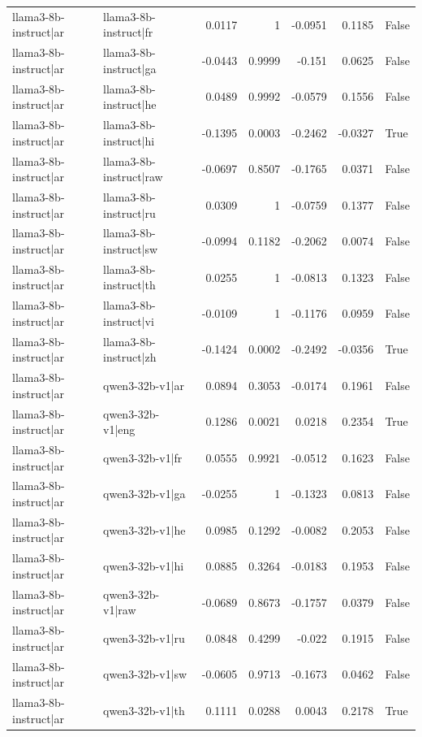 \begin{table}
\begin{tabular}{l l r r r r l}
llama3-8b-instruct|ar & llama3-8b-instruct|fr & 0.0117 & 1 & -0.0951 & 0.1185 & False \\
llama3-8b-instruct|ar & llama3-8b-instruct|ga & -0.0443 & 0.9999 & -0.151 & 0.0625 & False \\
llama3-8b-instruct|ar & llama3-8b-instruct|he & 0.0489 & 0.9992 & -0.0579 & 0.1556 & False \\
llama3-8b-instruct|ar & llama3-8b-instruct|hi & -0.1395 & 0.0003 & -0.2462 & -0.0327 & True \\
llama3-8b-instruct|ar & llama3-8b-instruct|raw & -0.0697 & 0.8507 & -0.1765 & 0.0371 & False \\
llama3-8b-instruct|ar & llama3-8b-instruct|ru & 0.0309 & 1 & -0.0759 & 0.1377 & False \\
llama3-8b-instruct|ar & llama3-8b-instruct|sw & -0.0994 & 0.1182 & -0.2062 & 0.0074 & False \\
llama3-8b-instruct|ar & llama3-8b-instruct|th & 0.0255 & 1 & -0.0813 & 0.1323 & False \\
llama3-8b-instruct|ar & llama3-8b-instruct|vi & -0.0109 & 1 & -0.1176 & 0.0959 & False \\
llama3-8b-instruct|ar & llama3-8b-instruct|zh & -0.1424 & 0.0002 & -0.2492 & -0.0356 & True \\
llama3-8b-instruct|ar & qwen3-32b-v1|ar & 0.0894 & 0.3053 & -0.0174 & 0.1961 & False \\
llama3-8b-instruct|ar & qwen3-32b-v1|eng & 0.1286 & 0.0021 & 0.0218 & 0.2354 & True \\
llama3-8b-instruct|ar & qwen3-32b-v1|fr & 0.0555 & 0.9921 & -0.0512 & 0.1623 & False \\
llama3-8b-instruct|ar & qwen3-32b-v1|ga & -0.0255 & 1 & -0.1323 & 0.0813 & False \\
llama3-8b-instruct|ar & qwen3-32b-v1|he & 0.0985 & 0.1292 & -0.0082 & 0.2053 & False \\
llama3-8b-instruct|ar & qwen3-32b-v1|hi & 0.0885 & 0.3264 & -0.0183 & 0.1953 & False \\
llama3-8b-instruct|ar & qwen3-32b-v1|raw & -0.0689 & 0.8673 & -0.1757 & 0.0379 & False \\
llama3-8b-instruct|ar & qwen3-32b-v1|ru & 0.0848 & 0.4299 & -0.022 & 0.1915 & False \\
llama3-8b-instruct|ar & qwen3-32b-v1|sw & -0.0605 & 0.9713 & -0.1673 & 0.0462 & False \\
llama3-8b-instruct|ar & qwen3-32b-v1|th & 0.1111 & 0.0288 & 0.0043 & 0.2178 & True \\

\end{tabular}
\end{table}

